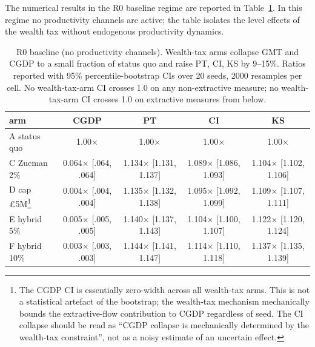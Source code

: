 \documentclass[11pt]{article}
\begin{document}
The numerical results in the R0 baseline regime are reported in
Table~\ref{tab:baseline}.  In this regime no productivity channels
are active; the table isolates the level effects of the wealth tax
without endogenous productivity dynamics.

\begin{table}[h]
\centering
\small
\caption{R0 baseline (no productivity channels).  Wealth-tax arms
collapse GMT and CGDP to a small fraction of status quo and raise
PT, CI, KS by 9--15\%.  Ratios reported with 95\% percentile-bootstrap
CIs over 20 seeds, 2000 resamples per cell.  No wealth-tax-arm CI
crosses 1.0 on any non-extractive measure; no wealth-tax-arm CI
crosses 1.0 on extractive measures from below.}
\label{tab:baseline}
\begin{tabular}{lcccc}
\toprule
arm & CGDP & PT & CI & KS \\
\midrule
A status quo     & 1.00$\times$
                  & 1.00$\times$
                  & 1.00$\times$
                  & 1.00$\times$ \\
C Zucman 2\%     & 0.064$\times$ [.064, .064]
                  & 1.134$\times$ [1.131, 1.137]
                  & 1.089$\times$ [1.086, 1.093]
                  & 1.104$\times$ [1.102, 1.106] \\
D cap \pounds 5M\footnote{The CGDP CI is essentially zero-width
across all wealth-tax arms.  This is not a statistical artefact of
the bootstrap; the wealth-tax mechanism mechanically bounds the
extractive-flow contribution to CGDP regardless of seed.  The CI
collapse should be read as ``CGDP collapse is mechanically
determined by the wealth-tax constraint'', not as a noisy estimate
of an uncertain effect.} & 0.004$\times$ [.004, .004]
                  & 1.135$\times$ [1.132, 1.138]
                  & 1.095$\times$ [1.092, 1.099]
                  & 1.109$\times$ [1.107, 1.111] \\
E hybrid 5\%     & 0.005$\times$ [.005, .005]
                  & 1.140$\times$ [1.137, 1.143]
                  & 1.104$\times$ [1.100, 1.107]
                  & 1.122$\times$ [1.120, 1.124] \\
F hybrid 10\%    & 0.003$\times$ [.003, .003]
                  & 1.144$\times$ [1.141, 1.147]
                  & 1.114$\times$ [1.110, 1.118]
                  & 1.137$\times$ [1.135, 1.139] \\
\bottomrule
\end{tabular}
\end{table}
\end{document}
